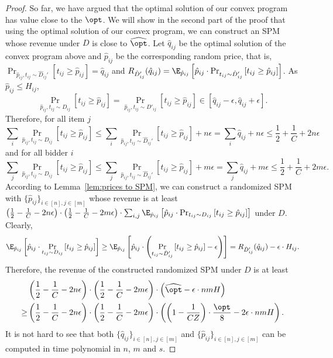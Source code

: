 \begin{proof}
So far, we have argued that the optimal solution of our convex program has value close to the $\opt$. We will show in the second part of the proof that using the optimal solution of our convex program, we can construct an SPM whose revenue under $D$ is close to $\widehat{\opt}$. Let $\hat{q}_{ij}$ be the optimal solution of the convex program above and $\hat{p}_{ij}$ be the corresponding random price, that is, $\Pr_{\hat{p}_{ij}, t_{ij}\sim \hat{D}_{ij}'}\left[t_{ij}\geq \hat{p}_{ij}\right]=\hat{q}_{ij}$ and $R_{\hat{D}_{ij}'}(\hat{q}_{ij}) = \E_{\hat{p}_{ij}}\left[\hat{p}_{ij}\cdot \Pr_{t_{ij}\sim \hat{D}_{ij}'}\left[t_{ij}\geq \hat{p}_{ij}\right]\right]$. As $\hat{p}_{ij}\leq H_{ij}$, $$\Pr_{\hat{p}_{ij}, t_{ij}\sim {D}_{ij}}\left[t_{ij}\geq \hat{p}_{ij}\right]=\Pr_{\hat{p}_{ij}, t_{ij}\sim {D}'_{ij}}\left[t_{ij}\geq \hat{p}_{ij}\right]\in  [\hat{q}_{ij}-\epsilon,\hat{q}_{ij}+\epsilon].$$ Therefore, for all item $j$ $$\sum_{i} \Pr_{\hat{p}_{ij}, t_{ij}\sim {D}_{ij}}\left[t_{ij}\geq \hat{p}_{ij}\right]\leq \sum_{i} \Pr_{\hat{p}_{ij}, t_{ij}\sim \hat{D}_{ij}'}\left[t_{ij}\geq \hat{p}_{ij}\right] + n\epsilon = \sum_i \hat{q}_{ij} +n\epsilon \leq \frac{1}{2} + \frac{1}{C} +2n\epsilon$$ and for all bidder $i$	$$\sum_{j} \Pr_{\hat{p}_{ij}, t_{ij}\sim {D}_{ij}}\left[t_{ij}\geq \hat{p}_{ij}\right]\leq \sum_{j} \Pr_{\hat{p}_{ij}, t_{ij}\sim \hat{D}_{ij}'}\left[t_{ij}\geq \hat{p}_{ij}\right] + m\epsilon = \sum_j \hat{q}_{ij} +m\epsilon \leq \frac{1}{2} + \frac{1}{C} +2m\epsilon.$$ According to Lemma~\ref{lem:prices to SPM}, we can construct a randomized SPM with $\{\hat{p}_{ij}\}_{i\in[n],j\in[m]}$ whose revenue is at least $\left(\frac{1}{2}-\frac{1}{C}-2n\epsilon\right)\cdot\left(\frac{1}{2}-\frac{1}{C}-2m\epsilon\right)\cdot \sum_{i,j} \E_{\hat{p}_{ij}}\left[\hat{p}_{ij}\cdot \Pr_{t_{ij}\sim {D}_{ij}}\left[t_{ij}\geq \hat{p}_{ij}\right]\right]$ under $D$. 
Clearly, $$\E_{\hat{p}_{ij}}\left[\hat{p}_{ij}\cdot \Pr_{t_{ij}\sim {D}_{ij}}\left[t_{ij}\geq \hat{p}_{ij}\right]\right]\geq \E_{\hat{p}_{ij}}\left[\hat{p}_{ij}\cdot \left(\Pr_{t_{ij}\sim \hat{D}'_{ij}}\left[t_{ij}\geq \hat{p}_{ij}\right]-\epsilon\right)\right] = R_{\hat{D}'_{ij}}(\hat{q}_{ij})-\epsilon\cdot H_{ij}.$$ Therefore, the revenue of the constructed randomized SPM under $D$ is at least \begin{align*} &\left(\frac{1}{2}-\frac{1}{C}-2n\epsilon\right)\cdot\left(\frac{1}{2}-\frac{1}{C}-2m\epsilon\right)\cdot \left(\widehat{\opt}-\epsilon\cdot nmH\right)\\
 	\geq & \left(\frac{1}{2}-\frac{1}{C}-2n\epsilon\right)\cdot\left(\frac{1}{2}-\frac{1}{C}-2m\epsilon\right)\cdot \left(\left(1-\frac{1}{ CZ}\right)\cdot \frac{\opt}{8}-2\epsilon\cdot nmH\right).
 \end{align*}
It is not hard to see that both $\{\hat{q}_{ij}\}_{i\in[n],j\in[m]}$ and $\{\hat{p}_{ij}\}_{i\in[n],j\in[m]}$ can be computed in time polynomial in $n$, $m$ and $s$.
	\end{proof}

